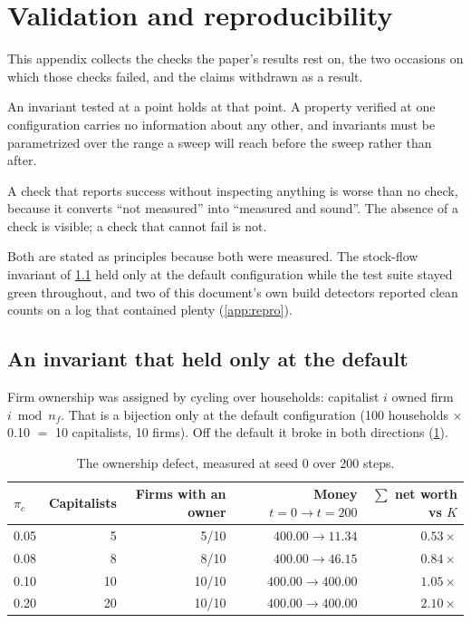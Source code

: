 
\section{Validation and reproducibility}
\label{app:validation}

This appendix collects the checks the paper's results rest on, the two
occasions on which those checks failed, and the claims withdrawn as a result.

\begin{remark}
An invariant tested at a point holds at that point. A property verified
at one configuration carries no information about any other, and invariants
must be parametrized over the range a sweep will reach before the sweep
rather than after.

A check that reports success without inspecting anything is worse than no
check, because it converts ``not measured'' into ``measured and sound''. The
absence of a check is visible; a check that cannot fail is not.

Both are stated as principles because both were measured. The stock-flow
invariant of \cref{app:ownership} held only at the default configuration while
the test suite stayed green throughout, and two of this document's own build
detectors reported clean counts on a log that contained plenty
(\cref{app:repro}).
\end{remark}

\subsection{An invariant that held only at the default}
\label{app:ownership}
\label{sec:ownership}

Firm ownership was assigned by cycling over households: capitalist $i$
owned firm $i \bmod n_f$. That is a bijection only at the default
configuration (100 households $\times$ 0.10 $=$ 10 capitalists, 10 firms). Off
the default it broke in both directions (\cref{tab:ownership}).

\begin{table}[htbp]
\centering
\small
\caption{The ownership defect, measured at seed 0 over 200 steps.}
\label{tab:ownership}
\begin{tabular}{lrrrr}
\toprule
$\pi_c$ & Capitalists & Firms with an owner & Money $t{=}0 \to t{=}200$
& $\sum$ net worth vs $K$\\
\midrule
0.05 & 5  & 5/10  & $400.00 \to 11.34$ & $0.53\times$\\
0.08 & 8  & 8/10  & $400.00 \to 46.15$ & $0.84\times$\\
0.10 & 10 & 10/10 & $400.00 \to 400.00$ & $1.05\times$\\
0.20 & 20 & 10/10 & $400.00 \to 400.00$ & $2.10\times$\\
\bottomrule
\end{tabular}
\end{table}

